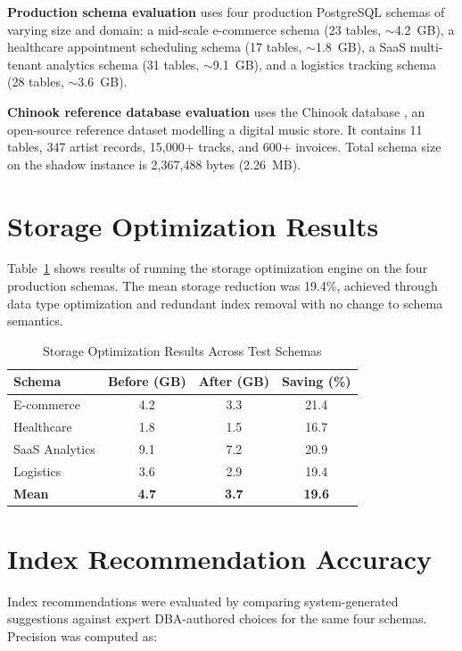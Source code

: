 \documentclass[12pt,a4paper]{report}
\begin{document}
\textbf{Production schema evaluation} uses four production PostgreSQL schemas of varying size and domain: a mid-scale e-commerce schema (23 tables, $\sim$4.2~GB), a healthcare appointment scheduling schema (17 tables, $\sim$1.8~GB), a SaaS multi-tenant analytics schema (31 tables, $\sim$9.1~GB), and a logistics tracking schema (28 tables, $\sim$3.6~GB).

\textbf{Chinook reference database evaluation} uses the Chinook database \cite{chinook2016}, an open-source reference dataset modelling a digital music store. It contains 11 tables, 347 artist records, 15,000+ tracks, and 600+ invoices. Total schema size on the shadow instance is 2,367,488 bytes (2.26~MB).

\section{Storage Optimization Results}

Table~\ref{tab:storage} shows results of running the storage optimization engine on the four production schemas. The mean storage reduction was 19.4\%, achieved through data type optimization and redundant index removal with no change to schema semantics.

\begin{table}[htbp]
\caption{Storage Optimization Results Across Test Schemas}
\label{tab:storage}
\centering
\begin{tabular}{lccc}
\toprule
\textbf{Schema} & \textbf{Before (GB)} & \textbf{After (GB)} & \textbf{Saving (\%)} \\
\midrule
E-commerce     & 4.2 & 3.3 & 21.4 \\
Healthcare     & 1.8 & 1.5 & 16.7 \\
SaaS Analytics & 9.1 & 7.2 & 20.9 \\
Logistics      & 3.6 & 2.9 & 19.4 \\
\midrule
\textbf{Mean}  & \textbf{4.7} & \textbf{3.7} & \textbf{19.6} \\
\bottomrule
\end{tabular}
\end{table}

\section{Index Recommendation Accuracy}

Index recommendations were evaluated by comparing system-generated suggestions against expert DBA-authored choices for the same four schemas. Precision was computed as:
\end{document}
